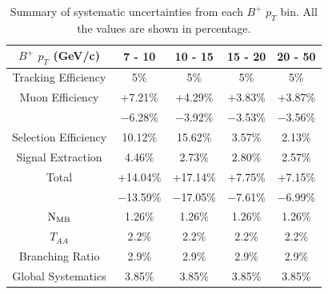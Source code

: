 \begin{table}[h]
\begin{center}
\caption{Summary of systematic uncertainties from each $B^+$ $p_T$ bin. All the values are shown in percentage.}
\vspace{1em}
\label{BsPtSystSum}
\begin{tabular}{ |c | c | c | c | c|}
\hline
$B^+$ $p_T$ (GeV/c) &  7 - 10 & 10 - 15 & 15 - 20 & 20 - 50  \\
\hline
Tracking Efficiency & 5\% & 5\% & 5\% & 5\% \\
Muon Efficiency     & +7.21\% & +4.29\% & +3.83\% & +3.87\% \\
                                & $-$6.28\% & $-$3.92\% & $-$3.53\% & $-$3.56\% \\
Selection Efficiency & 10.12\%  & 15.62\%  & 3.57\% & 2.13\%  \\
Signal Extraction & 4.46\%  & 2.73\% & 2.80\%  & 2.57\% \\
Total  & +14.04\% &  +17.14\% &  +7.75\% & +7.15\%  \\
      	 & $-$13.59\% &  $-$17.05\% &  $-$7.61\% &  $-$6.99\%  \\
\hline
 \hline
$\rm{N_{MB}} $ & 1.26\% & 1.26\% & 1.26\% & 1.26\% \\
$T_{AA}$ & 2.2\% & 2.2\% & 2.2\% & 2.2\% \\
Branching Ratio & 2.9\% & 2.9\% & 2.9\%& 2.9\%\\
Global Systematics & 3.85\% & 3.85\% & 3.85\%& 3.85\%\\
 \hline
\end{tabular}
\end{center}
\end{table}


